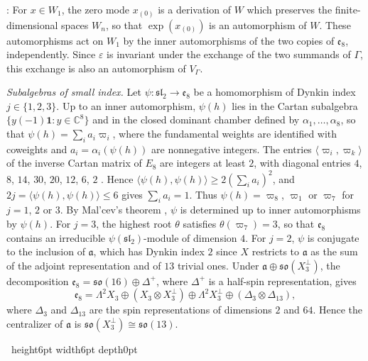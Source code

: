 \documentclass[leqno]{article}
\newcommand{\Cbb}{\ensuremath{\mathbb{C}}}
\renewcommand{\leq}{\ensuremath{\leqslant}}
\renewcommand{\geq}{\ensuremath{\geqslant}}
\newcommand{\qed}{\hfill \vrule height6pt  width6pt depth0pt}
\newcommand{\co}{\colon}
\newcommand{\ot}{\otimes}
\newcommand{\epsi}{\varepsilon}
\newenvironment{proof}[1][]{\noindent {\it Proof #1} : }{\hbox{~}\qed
\smallskip
}
\numberwithin{equation}{section}
\begin{document}
\begin{proof}
For $x \in W_1$, the zero mode $x_{(0)}$ is a derivation of $W$ which preserves the finite-dimensional spaces $W_n$, so that $\exp(x_{(0)})$ is an automorphism of $W$. These automorphisms act on $W_1$ by the inner automorphisms of the two copies of $\mathfrak e_8$, independently. Since $\epsi$ is invariant under the exchange of the two summands of $\Gamma$, this exchange is also an automorphism of $V_\Gamma$.

\emph{Subalgebras of small index.} Let $\psi \co \mathfrak{sl}_2 \to \mathfrak e_8$ be a homomorphism of Dynkin index $j \in \{1,2,3\}$. Up to an inner automorphism, $\psi(h)$ lies in the Cartan subalgebra $\{y(-1)\mathbf 1 : y \in \Cbb^8\}$ and in the closed dominant chamber defined by $\alpha_1, \ldots, \alpha_8$, so that $\psi(h) = \sum_i a_i\varpi_i$, where the fundamental weights are identified with coweights and $a_i = \alpha_i(\psi(h))$ are nonnegative integers. The entries $\langle\varpi_i,\varpi_k\rangle$ of the inverse Cartan matrix of $E_8$ are integers at least $2$, with diagonal entries $4$, $8$, $14$, $30$, $20$, $12$, $6$, $2$ \cite[Planche VII]{Bou68}. Hence $\langle\psi(h),\psi(h)\rangle \geq 2(\sum_i a_i)^2$, and $2j = \langle\psi(h),\psi(h)\rangle \leq 6$ gives $\sum_i a_i = 1$. Thus $\psi(h) = \varpi_8$, $\varpi_1$ or $\varpi_7$ for $j = 1$, $2$ or $3$. By Mal'cev's theorem \cite[Theorem 3.4.12]{CoM93}, $\psi$ is determined up to inner automorphisms by $\psi(h)$. For $j = 3$, the highest root $\theta$ satisfies $\theta(\varpi_7) = 3$, so that $\mathfrak e_8$ contains an irreducible $\psi(\mathfrak{sl}_2)$-module of dimension $4$. For $j = 2$, $\psi$ is conjugate to the inclusion of $\mathfrak a$, which has Dynkin index $2$ since $X$ restricts to $\mathfrak a$ as the sum of the adjoint representation and of $13$ trivial ones. Under $\mathfrak a \oplus \mathfrak{so}(X_3^\perp)$, the decomposition $\mathfrak e_8 = \mathfrak{so}(16) \oplus \Delta^+$, where $\Delta^+$ is a half-spin representation, gives
\[
\mathfrak e_8 = \Lambda^2X_3 \oplus (X_3 \ot X_3^\perp) \oplus \Lambda^2X_3^\perp \oplus (\Delta_3 \ot \Delta_{13}),
\]
where $\Delta_3$ and $\Delta_{13}$ are the spin representations of dimensions $2$ and $64$. Hence the centralizer of $\mathfrak a$ is $\mathfrak{so}(X_3^\perp) \cong \mathfrak{so}(13)$.


\end{proof}
\end{document}
